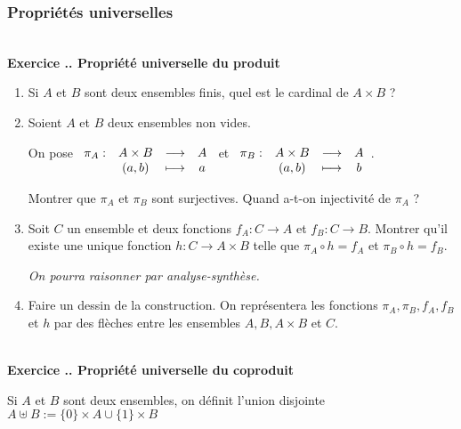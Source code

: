 \documentclass{article}
\newcommand{\fonction}[5]{\raisebox{-0.5\baselineskip}{$\begin{array}{lccc}
    #1: & #2 & \longrightarrow & #3 \\
        & #4 & \longmapsto & #5 \end{array}$}}
\newcounter{exo}
\newcommand{\exercice}[1][\null]{\textbf{\\ Exercice \thesection.\theexo. #1} \addtocounter{exo}{1}}
\begin{document}
\subsubsection{Propriétés universelles}

\exercice[Propriété universelle du produit]

\begin{enumerate}

\item Si $A$ et $B$ sont deux ensembles finis, quel est le cardinal de $A \times B$ ?

\item Soient $A$ et $B$ deux ensembles non vides.

On pose $\fonction{\pi_A}{A\times B}{A}{(a,b)}{a}$ et $\fonction{\pi_B}{A\times B}{A}{(a,b)}{b}$.

Montrer que $\pi_A$ et $\pi_B$ sont surjectives. Quand a-t-on injectivité de $\pi_A$ ?

\item Soit $C$ un ensemble et deux fonctions $f_A : C \rightarrow A$ et $f_B : C \rightarrow B$. Montrer qu'il existe une unique fonction $h : C \rightarrow A \times B$ telle que $\pi_A \circ h = f_A$ et $\pi_B \circ h = f_B$. 

\emph{On pourra raisonner par analyse-synthèse.}

\item Faire un dessin de la construction. On représentera les fonctions $\pi_A, \pi_B, f_A, f_B$ et $h$ par des flèches entre les ensembles $A, B, A \times B$ et $C$.

\end{enumerate}



\exercice[Propriété universelle du coproduit]

 Si $A$ et $B$ sont deux ensembles, on définit l'union disjointe $A \uplus B := \{0\} \times A \cup \{1\} \times B $
\end{document}

